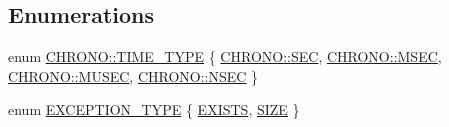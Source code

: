 \subsection*{Enumerations}
\begin{DoxyCompactItemize}
\item 
enum \mbox{\hyperlink{namespace_c_h_r_o_n_o_a246e471488a6e6b17ddb86e3b817c7d9}{C\+H\+R\+O\+N\+O\+::\+T\+I\+M\+E\+\_\+\+T\+Y\+PE}} \{ \mbox{\hyperlink{namespace_c_h_r_o_n_o_a246e471488a6e6b17ddb86e3b817c7d9ac09415dca4fa7975506ab664d88b403a}{C\+H\+R\+O\+N\+O\+::\+S\+EC}}, 
\mbox{\hyperlink{namespace_c_h_r_o_n_o_a246e471488a6e6b17ddb86e3b817c7d9a2060724ab75592144c0b930e3394d845}{C\+H\+R\+O\+N\+O\+::\+M\+S\+EC}}, 
\mbox{\hyperlink{namespace_c_h_r_o_n_o_a246e471488a6e6b17ddb86e3b817c7d9aba8c3a9d281e3b934b74d5ff97a3a093}{C\+H\+R\+O\+N\+O\+::\+M\+U\+S\+EC}}, 
\mbox{\hyperlink{namespace_c_h_r_o_n_o_a246e471488a6e6b17ddb86e3b817c7d9a06ab3311d8f423104c3beae640896013}{C\+H\+R\+O\+N\+O\+::\+N\+S\+EC}}
 \}
\item 
enum \mbox{\hyperlink{utils_8hh_af26a5d951fd6ab4b44e6cd8425aa0383}{E\+X\+C\+E\+P\+T\+I\+O\+N\+\_\+\+T\+Y\+PE}} \{ \mbox{\hyperlink{utils_8hh_af26a5d951fd6ab4b44e6cd8425aa0383a3197625a1bb2264943f5a95f236d9973}{E\+X\+I\+S\+TS}}, 
\mbox{\hyperlink{utils_8hh_af26a5d951fd6ab4b44e6cd8425aa0383a4aa71180778b711338785695df5d7c52}{S\+I\+ZE}}
 \}
\end{DoxyCompactItemize}
